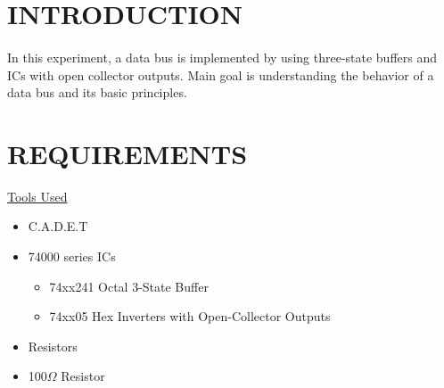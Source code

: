 \documentclass[pdftex,12pt,a4paper]{article}
\begin{document}
\setcounter{page}{1}

\section{INTRODUCTION}
\begin{flushleft}
\paragraph{}
In this experiment, a data bus is implemented by using three-state buffers and ICs with open collector outputs. Main goal is understanding the behavior of a data bus and its basic principles. 
\end{flushleft}
\section{REQUIREMENTS}
\begin{flushleft}
\underline{Tools Used}\cite{booklet}
\end{flushleft}

\begin{itemize}
    \item C.A.D.E.T
    \item 74000 series ICs
    \begin{itemize}
        \item 74xx241 Octal 3-State Buffer
        \item 74xx05 Hex Inverters with Open-Collector Outputs 
    \end{itemize}
    \item Resistors
    \item 100$\Omega$ Resistor
\end{itemize}
\end{document}
